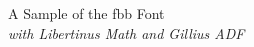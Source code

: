 \documentclass[11pt]{article}
\begin{document}
{\LARGE \noindent A Sample of the fbb Font}\\

{\large \noindent \textit{with Libertinus Math and Gillius ADF}}\\[5pt]


\end{document}
